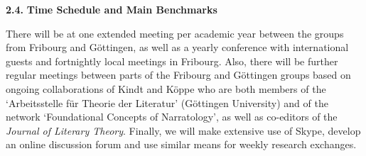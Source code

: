 
\vspace{.2cm}
{\textbf{2.4.  }}\textbf{Time Schedule and Main Benchmarks}
\vspace{.2cm}

\noindent There will be at one extended meeting per academic year between the groups from Fribourg and G\"ottingen, as well as a yearly conference with international guests and fortnightly local meetings in Fribourg. Also, there will be further regular meetings between parts of the Fribourg and G\"ottingen groups based on ongoing collaborations of Kindt and K\"oppe who are both members of the `Arbeitsstelle f\"ur Theorie der Literatur' (G\"ottingen University) and of the network `Foundational Concepts of Narratology', as well as co-editors of the \emph{Journal of Literary Theory}. Finally, we will make extensive use of Skype, develop an online discussion forum and use similar means for weekly research exchanges.

\vspace{.5cm}
\setlength{\parindent}{-20pt}
\setlength{\parindent}{10pt}

